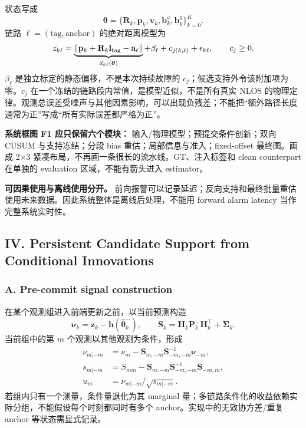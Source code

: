 \documentclass[UTF8,fontset=fandol,11pt,a4paper]{ctexart}
\begin{document}
状态写成
\begin{equation}
 \bm\theta=\{\mathbf R_k,\mathbf p_k,\mathbf v_k,
 \mathbf b^a_k,\mathbf b^g_k\}_{k=0}^{K}.
\end{equation}
链路 \(\ell=(\text{tag},\text{anchor})\) 的绝对距离模型为
\begin{equation}
 z_{k\ell}=\underbrace{\|\mathbf p_k+\mathbf R_k\mathbf l_{\rm tag}
              -\mathbf a_\ell\|}_{d_{k\ell}(\bm\theta)}
       +\beta_\ell+c_{j(k,\ell)}+\epsilon_{k\ell},
 \qquad c_j\geq 0.
 \label{eq:range}
\end{equation}
\(\beta_\ell\) 是独立标定的静态偏移，不是本次持续故障的 \(c_j\)；候选支持外令该附加项为零。\(c_j\) 在一个冻结的链路段内常值，是模型近似，不是所有真实 NLOS 的物理定律。观测总误差受噪声与其他因素影响，可以出现负残差；不能把“额外路径长度通常为正”写成“所有实际误差都严格为正”。

\textbf{系统框图 F1 应只保留六个模块：}
输入/物理模型；预提交条件创新；双向 CUSUM 与支持冻结；分段 bias 重估；局部信息与准入；fixed-offset 最终图。画成 2\(\times\)3 紧凑布局，不再画一条很长的流水线。GT、注入标签和 clean counterpart 在单独的 evaluation 区域，不能有箭头进入 estimator。

\textbf{可因果使用与离线使用分开。} 前向报警可以记录延迟；反向支持和最终批量重估使用未来数据。因此系统整体是离线后处理，不能用 forward alarm latency 当作完整系统实时性。

\subsection{IV. Persistent Candidate Support from Conditional Innovations}

\subsubsection{A. Pre-commit signal construction}
在某个观测组进入前端更新之前，以当前预测构造
\begin{equation}
 \bm\nu_k=\mathbf z_k-\mathbf h(\hat{\bm\theta}^{-}_k),
 \qquad \mathbf S_k=\mathbf H_k\mathbf P_k^{-}\mathbf H_k^\top+\bm\Sigma_k.
\end{equation}
当前组中的第 \(m\) 个观测以其他观测为条件，形成
\begin{align}
 \nu_{m|-m}&=\nu_m-\mathbf S_{m,-m}\mathbf S_{-m,-m}^{-1}\bm\nu_{-m},\\
 s_{m|-m}&=S_{mm}-\mathbf S_{m,-m}\mathbf S_{-m,-m}^{-1}\mathbf S_{-m,m},\\
 u_m&=\nu_{m|-m}/\sqrt{s_{m|-m}}.
 \label{eq:conditional}
\end{align}
若组内只有一个测量，条件量退化为其 marginal 量；多链路条件化的收益依赖实际分组，不能假设每个时刻都同时有多个 anchor。实现中的无效协方差/重复 anchor 等状态需显式记录。\cite{conditional,provider}
\end{document}

